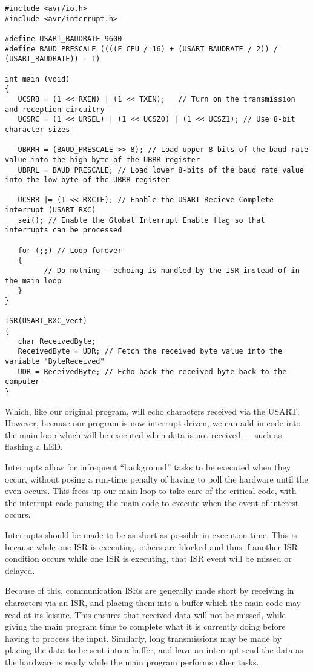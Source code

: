 \documentclass[a4paper,oneside,notitlepage]{book}
\begin{document}
\begin{center}
\begin{lstlisting}
#include <avr/io.h>
#include <avr/interrupt.h>

#define USART_BAUDRATE 9600
#define BAUD_PRESCALE ((((F_CPU / 16) + (USART_BAUDRATE / 2)) / (USART_BAUDRATE)) - 1)

int main (void)
{
   UCSRB = (1 << RXEN) | (1 << TXEN);   // Turn on the transmission and reception circuitry
   UCSRC = (1 << URSEL) | (1 << UCSZ0) | (1 << UCSZ1); // Use 8-bit character sizes

   UBRRH = (BAUD_PRESCALE >> 8); // Load upper 8-bits of the baud rate value into the high byte of the UBRR register
   UBRRL = BAUD_PRESCALE; // Load lower 8-bits of the baud rate value into the low byte of the UBRR register

   UCSRB |= (1 << RXCIE); // Enable the USART Recieve Complete interrupt (USART_RXC)
   sei(); // Enable the Global Interrupt Enable flag so that interrupts can be processed

   for (;;) // Loop forever
   {
         // Do nothing - echoing is handled by the ISR instead of in the main loop
   }
}

ISR(USART_RXC_vect)
{
   char ReceivedByte;
   ReceivedByte = UDR; // Fetch the received byte value into the variable "ByteReceived"
   UDR = ReceivedByte; // Echo back the received byte back to the computer
}
\end{lstlisting}
\end{center}

Which, like our original program, will echo characters received via the USART. However, because our program is now interrupt driven, we can add in code into the main loop which will be executed when data is not received --- such as flashing a LED.

Interrupts allow for infrequent ``background'' tasks to be executed when they occur, without posing a run-time penalty of having to poll the hardware until the even occurs. This frees up our main loop to take care of the critical code, with the interrupt code pausing the main code to execute when the event of interest occurs.

Interrupts should be made to be as short as possible in execution time. This is because while one ISR is executing, others are blocked and thus if another ISR condition occurs while one ISR is executing, that ISR event will be missed or delayed.

Because of this, communication ISRs are generally made short by receiving in characters via an ISR, and placing them into a buffer which the main code may read at its leisure. This ensures that received data will not be missed, while giving the main program time to complete what it is currently doing before having to process the input. Similarly, long transmissions may be made by placing the data to be sent into a buffer, and have an interrupt send the data as the hardware is ready while the main program performs other tasks.
\end{document}
